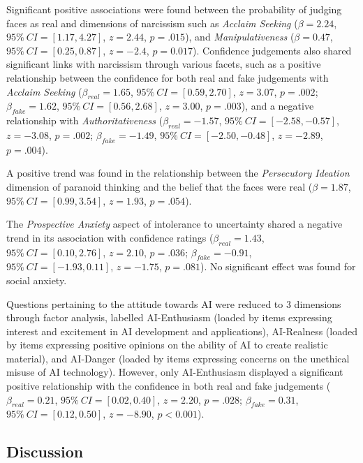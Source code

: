 \documentclass[
  man,floatsintext]{apa6}
\begin{document}
Significant positive associations were found between the probability of judging faces as real and dimensions of narcissism such as \emph{Acclaim Seeking} (\(\beta = 2.24\), \(95\%~CI = [1.17, 4.27]\), \(z = 2.44\), \(p = .015\)), and \emph{Manipulativeness} (\(\beta = 0.47\), \(95\%~CI = [0.25, 0.87]\), \(z = -2.4\), \(p = 0.017\)). Confidence judgements also shared significant links with narcissism through various facets, such as a positive relationship between the confidence for both real and fake judgements with \emph{Acclaim Seeking} (\(\beta_{real} = 1.65\), \(95\%~CI = [0.59, 2.70]\), \(z = 3.07\), \(p =.002\); \(\beta_{fake} = 1.62\), \(95\%~CI = [0.56, 2.68]\), \(z = 3.00\), \(p = .003\)), and a negative relationship with \emph{Authoritativeness} (\(\beta_{real} = -1.57\), \(95\%~CI = [-2.58, -0.57]\), \(z = -3.08\), \(p = .002\); \(\beta_{fake} = -1.49\), \(95\%~CI = [-2.50, -0.48]\), \(z = -2.89\), \(p = .004\)).

A positive trend was found in the relationship between the \emph{Persecutory Ideation} dimension of paranoid thinking and the belief that the faces were real (\(\beta = 1.87\), \(95\%~CI = [0.99, 3.54]\), \(z = 1.93\), \(p = .054\)).

The \emph{Prospective Anxiety} aspect of intolerance to uncertainty shared a negative trend in its association with confidence ratings (\(\beta_{real} = 1.43\), \(95\%~CI = [0.10, 2.76]\), \(z = 2.10\), \(p = .036\); \(\beta_{fake} = -0.91\), \(95\%~CI = [-1.93, 0.11]\), \(z = -1.75\), \(p = .081\)). No significant effect was found for social anxiety.

Questions pertaining to the attitude towards AI were reduced to 3 dimensions through factor analysis, labelled AI-Enthusiasm (loaded by items expressing interest and excitement in AI development and applications), AI-Realness (loaded by items expressing positive opinions on the ability of AI to create realistic material), and AI-Danger (loaded by items expressing concerns on the unethical misuse of AI technology). However, only AI-Enthusiasm displayed a significant positive relationship with the confidence in both real and fake judgements (\(\beta_{real} = 0.21\), \(95\%~CI = [0.02, 0.40]\), \(z = 2.20\), \(p = .028\); \(\beta_{fake} = 0.31\), \(95\%~CI = [0.12, 0.50]\), \(z = -8.90\), \(p < 0.001\)).

\hypertarget{discussion}{%
\subsection{Discussion}\label{discussion}}
\end{document}
